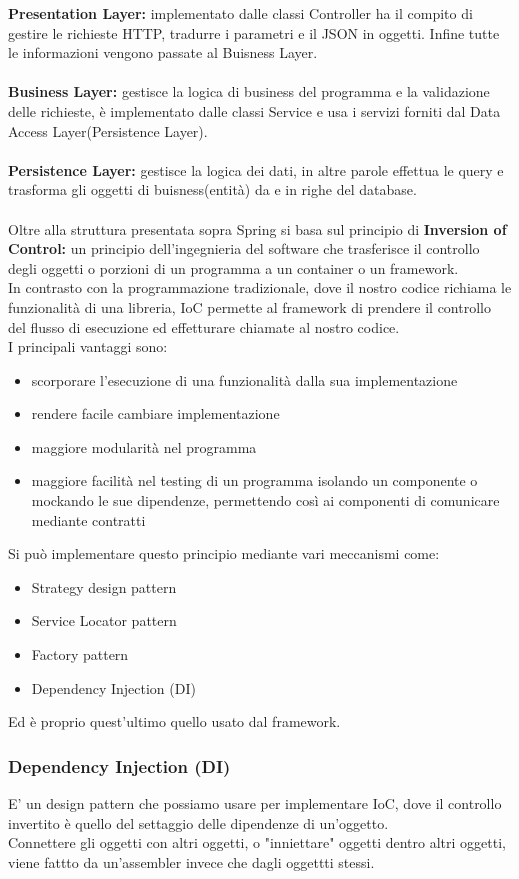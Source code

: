 \documentclass[a4paper,12pt,openany,oneside]{book}
\begin{document}
\textbf{Presentation Layer:} implementato dalle classi Controller ha il compito di gestire le richieste HTTP, tradurre i parametri e il JSON in oggetti.
Infine tutte le informazioni vengono passate al Buisness Layer.\\\\
\textbf{Business Layer:} gestisce la logica di business del programma e la validazione delle richieste, è implementato dalle classi Service e usa i servizi forniti dal Data Access Layer(Persistence Layer).\\\\
\textbf{Persistence Layer:} gestisce la logica dei dati, in altre parole effettua le query e trasforma gli oggetti di buisness(entità) da e in righe del database.\\\\
Oltre alla struttura presentata sopra Spring si basa sul principio di \textbf{Inversion of Control:}
un principio dell'ingegnieria del software che trasferisce il controllo degli oggetti o porzioni di un programma a un container o un framework.\\
In contrasto con la programmazione tradizionale, dove il nostro codice richiama le funzionalità di una libreria, IoC permette al framework di prendere il controllo del flusso di esecuzione ed effetturare chiamate al nostro codice.
\\I principali vantaggi sono:
\begin{itemize}
  \item scorporare l'esecuzione di una funzionalità dalla sua implementazione
  \item rendere facile cambiare implementazione
  \item maggiore modularità nel programma
  \item maggiore facilità nel testing di un programma isolando un componente o mockando le sue dipendenze, permettendo così ai componenti di comunicare mediante contratti
\end{itemize}
Si può implementare questo principio mediante vari meccanismi come:
\begin{itemize}
  \item Strategy design pattern
  \item Service Locator pattern
  \item Factory pattern
  \item Dependency Injection (DI)
\end{itemize}
Ed è proprio quest'ultimo quello usato dal framework.
\subsubsection{Dependency Injection (DI)}
E' un design pattern che possiamo usare per implementare IoC, dove il controllo invertito è quello del settaggio delle dipendenze di un'oggetto.\\
Connettere gli oggetti con altri oggetti, o "inniettare" oggetti dentro altri oggetti, viene fattto da un'assembler invece che dagli oggettti stessi.
\end{document}
